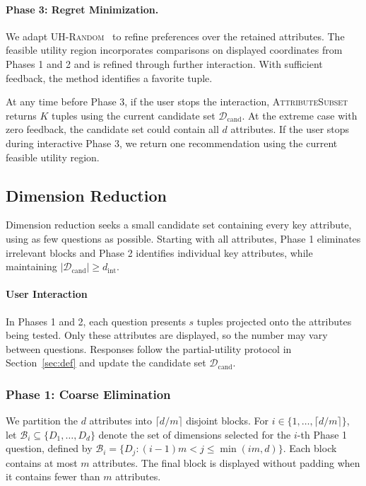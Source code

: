 \paragraph{Phase 3: Regret Minimization.}
We adapt \textsc{UH-Random}~\cite{XCL19} to refine preferences over the retained attributes. The feasible utility region incorporates comparisons on displayed coordinates from Phases 1 and 2 and is refined through further interaction. With sufficient feedback, the method identifies a favorite tuple.

At any time before Phase 3, if the user stops the interaction, \textsc{AttributeSubset} returns $K$ tuples using the current candidate set $\mathcal{D}_\text{cand}$. At the extreme case with zero feedback, the candidate set could contain all $d$ attributes. If the user stops during interactive Phase 3, we return one recommendation using the current feasible utility region.

\subsection{Dimension Reduction}
\label{subsec:dimR}

Dimension reduction seeks a small candidate set containing every key attribute, using as few questions as possible. Starting with all attributes, Phase 1 eliminates irrelevant blocks and Phase 2 identifies individual key attributes, while maintaining $\lvert\mathcal{D}_\text{cand}\rvert\geq d_\text{int}$.

\paragraph{\textbf{User Interaction}} 
In Phases 1 and 2, each question presents $s$ tuples projected onto the attributes being tested. Only these attributes are displayed, so the number may vary between questions. Responses follow the partial-utility protocol in Section~\ref{sec:def} and update the candidate set $\mathcal{D}_\text{cand}$.

\subsubsection{\textbf{Phase 1: Coarse Elimination}}

We partition the $d$ attributes into $\lceil d/m\rceil$ disjoint blocks. For $i\in\{1,\ldots,\lceil d/m\rceil\}$, let $\mathcal{B}_i\subseteq\{D_1,\ldots,D_d\}$ denote the set of dimensions selected for the $i$-th Phase 1 question, defined by $\mathcal{B}_i=\{D_j:(i-1)m<j\leq\min(im,d)\}$. Each block contains at most $m$ attributes. The final block is displayed without padding when it contains fewer than $m$ attributes.

